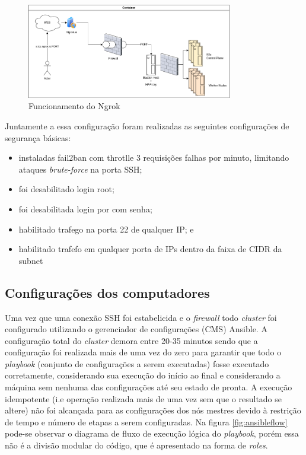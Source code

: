 \begin{figure}[!ht]
    \centering
    \includegraphics[width=0.8\textwidth]{04-figuras/ngroktcp.png}
    \caption{Funcionamento do Ngrok}
    \label{fig:ngroktcp}
\end{figure}

Juntamente a essa configuração foram realizadas as seguintes configurações de segurança básicas:

\begin{itemize}
    \item instaladas fail2ban com throtlle 3 requisições falhas por minuto, limitando ataques \emph{brute-force} na porta SSH;
    \item foi desabilitado login root;
    \item foi desabilitada login por com senha;
    \item habilitado trafego na porta 22 de qualquer IP; e
    \item habilitado trafefo em qualquer porta de IPs dentro da faixa de CIDR da subnet
\end{itemize}



\subsection{Configurações dos computadores }
Uma vez que uma conexão SSH foi estabelicida e o \emph{firewall} todo  \emph{cluster} foi configurado utilizando o gerenciador de configurações (CMS) Ansible\textregistered. A configuração total do \emph{cluster} demora entre 20-35 minutos sendo que a configuração foi realizada mais de uma vez do zero para garantir que todo o \emph{playbook} (conjunto de configurações a serem executadas) fosse executado corretamente, considerando sua execução do início ao final e considerando a máquina sem nenhuma das configurações até seu estado de pronta. A execução idempotente (i.e operação realizada mais de uma vez sem que o resultado se altere) não foi alcançada para as configurações dos nós mestres devido à restrição de tempo e número de etapas a serem configuradas. Na figura \ref{fig:ansibleflow} pode-se observar o diagrama de fluxo de execução lógica do \emph{playbook}, porém essa não é a divisão modular do código, que é apresentado na forma de \emph{roles}. 

